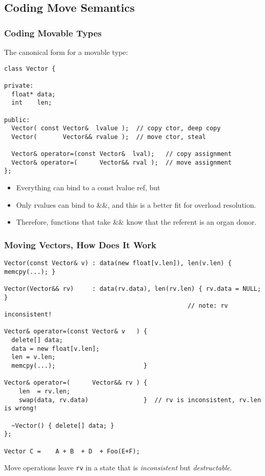 
\subsection[Coding]{Coding Move Semantics}\lyxframeend{}


\begin{frame}[fragile]
\frametitle{Coding Movable Types}

The canonical form for a movable type:

{\scriptsize
\begin{verbatim}
class Vector { 

private:
  float* data;
  int    len;

public:
  Vector( const Vector&  lvalue );  // copy ctor, deep copy
  Vector(       Vector&& rvalue );  // move ctor, steal

  Vector& operator=(const Vector&  lval);   // copy assignment
  Vector& operator=(      Vector&& rval );  // move assignment
};
\end{verbatim}
}
\pause
\begin{itemize}[<+->]
\item Everything can bind to a const lvalue ref, but
\item Only rvalues can bind to \&\&, and this is a better fit for overload resolution.
\item Therefore, functions that take \&\& know that the referent is
an organ donor.
\end{itemize}

\end{frame}


\begin{frame}[fragile]
\frametitle{Moving Vectors, How Does It Work}
{\scriptsize
\begin{verbatim}
Vector(const Vector& v) : data(new float[v.len]), len(v.len) { memcpy(...); }

Vector(Vector&& rv)     : data(rv.data), len(rv.len) { rv.data = NULL; }    
                                                  // note: rv inconsistent!

Vector& operator=(const Vector& v   ) { 
  delete[] data;   
  data = new float[v.len]; 
  len = v.len;  
  memcpy(...);                        }

Vector& operator=(      Vector&& rv ) {
    len  = rv.len;     
    swap(data, rv.data)               }  // rv is inconsistent, rv.len is wrong!

  ~Vector() { delete[] data; }
};

Vector C =    A + B  + D  + Foo(E+F);
\end{verbatim}
}

Move operations leave \texttt{rv} in a state that is \emph{inconsistent} but
\emph{destructable}.
\vfill

\end{frame}


